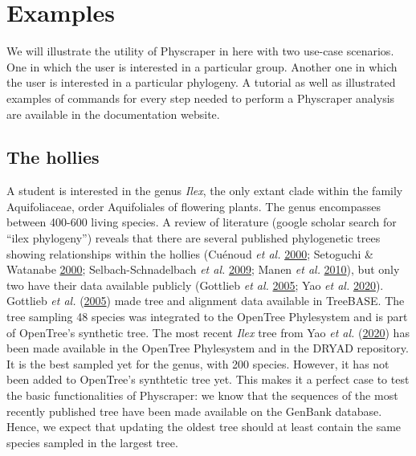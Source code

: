 \documentclass[]{article}
\begin{document}
\hypertarget{examples}{%
\section{Examples}\label{examples}}

We will illustrate the utility of Physcraper in here with two use-case scenarios. One in which the user is interested in a particular group. Another one in which the user is interested in a particular phylogeny.
A tutorial as well as illustrated examples of commands for every step needed to perform a Physcraper analysis are available in the documentation website.

\hypertarget{the-hollies}{%
\subsection{The hollies}\label{the-hollies}}

A student is interested in the genus \emph{Ilex}, the only extant clade within the family Aquifoliaceae, order Aquifoliales of flowering plants.
The genus encompasses between 400-600 living species. A review of literature (google scholar search for ``ilex phylogeny'') reveals that there are several published phylogenetic trees showing relationships within the hollies (Cuénoud \emph{et al.} \protect\hyperlink{ref-cuenoud2000molecular}{2000}; Setoguchi \& Watanabe \protect\hyperlink{ref-setoguchi2000intersectional}{2000}; Selbach-Schnadelbach \emph{et al.} \protect\hyperlink{ref-selbach2009new}{2009}; Manen \emph{et al.} \protect\hyperlink{ref-manen2010history}{2010}), but only two have their data available publicly (Gottlieb \emph{et al.} \protect\hyperlink{ref-gottlieb2005molecular}{2005}; Yao \emph{et al.} \protect\hyperlink{ref-yao2020phylogeny}{2020}).
Gottlieb \emph{et al.} (\protect\hyperlink{ref-gottlieb2005molecular}{2005}) made tree and alignment data available in TreeBASE. The tree sampling 48 species was integrated to the OpenTree Phylesystem and is part of OpenTree's synthetic tree.
The most recent \emph{Ilex} tree from Yao \emph{et al.} (\protect\hyperlink{ref-yao2020phylogeny}{2020}) has been made available in the OpenTree Phylesystem and in the DRYAD repository. It is the best sampled yet for the genus, with 200 species. However, it has not been added to OpenTree's synthtetic tree yet.
This makes it a perfect case to test the basic functionalities of Physcraper: we know that the sequences of the most recently published tree have been made available on the GenBank database. Hence, we expect that updating the oldest tree should at least contain the same species sampled in the largest tree.
\end{document}
